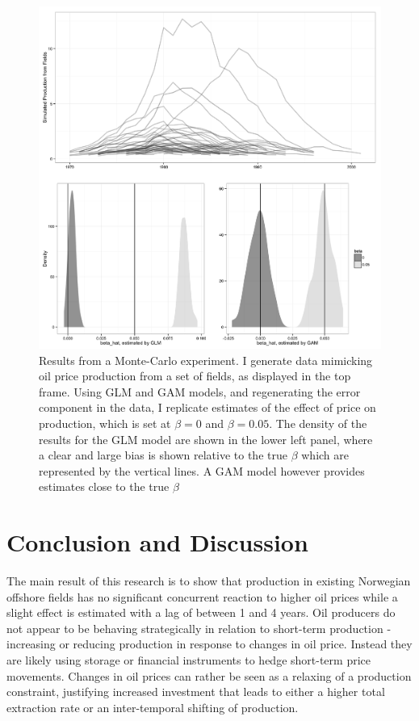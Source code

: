 \documentclass[12pt]{article}
\begin{document}
\begin{figure}
	\includegraphics[width=1\textwidth]{figures/mc_plot.png}
	\caption{Results from a Monte-Carlo experiment. I generate data mimicking oil price production from a set of fields, as displayed in the top frame. Using GLM and GAM models, and regenerating the error component in the data, I replicate estimates of the effect of price on production, which is set at $\beta = 0$ and $\beta=0.05$. The density of the results for the GLM model are shown in the lower left panel, where a clear and large bias is shown relative to the true $\beta$ which are represented by the vertical lines.  A GAM model however provides estimates close to the true $\beta$}
	\label{mc_results}
\end{figure}

\section{Conclusion and Discussion}

The main result of this research is to show that production in existing Norwegian offshore fields has no significant concurrent reaction to higher oil prices while a slight effect is estimated  with a lag of between 1 and 4 years.  Oil producers do not appear to be behaving strategically in relation to short-term production - increasing or reducing production in response to changes in oil price.  Instead they are likely using storage or financial instruments to hedge short-term price movements. Changes in oil prices can rather be seen as a relaxing of a production constraint, justifying increased investment that leads to either a higher total extraction rate or an inter-temporal shifting of production.
\end{document}
